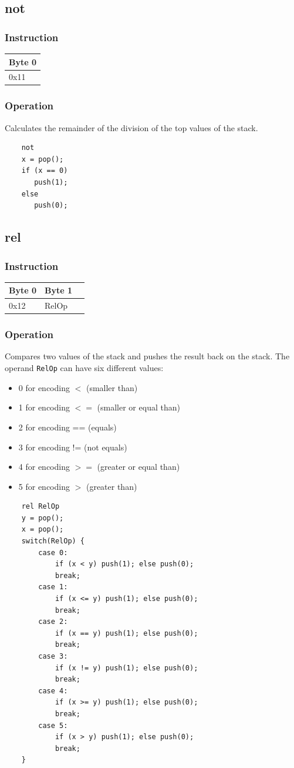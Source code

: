 \documentclass[11pt]{report}
\newcommand{\onebyteinstruction}[1]{
\begin{tabular}{|p{3.9em}|}
\hline
\tiny{Byte 0} \\ \hline
#1  \\ \hline
\end{tabular}
}
\newcommand{\twobyteinstruction}[2]{
\begin{tabular}{|p{3.9em}|p{9em}|p{9em}|}
\hline
\tiny{Byte 0} & \tiny{Byte 1} \\ \hline
#1 & #2 \\ \hline
\end{tabular}
}
\begin{document}
\subsection{not}
\subsubsection{Instruction}
\onebyteinstruction{0x11}

\subsubsection{Operation}
Calculates the remainder of the division of the top values of the stack.

	\begin{lstlisting}
	not
	x = pop();
	if (x == 0)
	   push(1);
	else
	   push(0);
	\end{lstlisting}

\subsection{rel}
\subsubsection{Instruction}
\twobyteinstruction{0x12}{RelOp}

\subsubsection{Operation}
Compares two values of the stack and pushes the result back on the stack. The operand \lstinline$RelOp$ can have six different values:
\begin{itemize}
	\item 0 for encoding $<$ (smaller than)
	\item 1 for encoding $<=$ (smaller or equal than)
	\item 2 for encoding == (equals)
	\item 3 for encoding != (not equals)
	\item 4 for encoding $>=$ (greater or equal than)
	\item 5 for encoding $>$ (greater than)
\end{itemize}
	\begin{lstlisting}
	rel RelOp
	y = pop();
	x = pop();
	switch(RelOp) {
		case 0:
			if (x < y) push(1); else push(0);
			break;
		case 1:
			if (x <= y) push(1); else push(0);
			break;
		case 2:
			if (x == y) push(1); else push(0);
			break;
		case 3:
			if (x != y) push(1); else push(0);
			break;
		case 4:
			if (x >= y) push(1); else push(0);
			break;
		case 5:
			if (x > y) push(1); else push(0);
			break;
	}
	\end{lstlisting}
\end{document}
